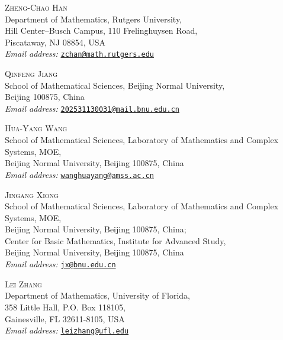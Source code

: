\documentclass[11pt]{article}
\numberwithin{equation}{section}
\theoremstyle{remark}
\begin{document}
\bigskip
\begingroup
\small
\noindent\textsc{Zheng-Chao Han}\\
Department of Mathematics, Rutgers University,\\
Hill Center--Busch Campus, 110 Frelinghuysen Road,\\
Piscataway, NJ 08854, USA\\
\textit{Email address:}
\href{mailto:zchan@math.rutgers.edu}{\nolinkurl{zchan@math.rutgers.edu}}

\medskip
\noindent\textsc{Qinfeng Jiang}\\
School of Mathematical Sciences, Beijing Normal University,\\
Beijing 100875, China\\
\textit{Email address:}
\href{mailto:202531130031@mail.bnu.edu.cn}%
{\nolinkurl{202531130031@mail.bnu.edu.cn}}

\medskip
\noindent\textsc{Hua-Yang Wang}\\
School of Mathematical Sciences, Laboratory of Mathematics and Complex
Systems, MOE,\\
Beijing Normal University, Beijing 100875, China\\
\textit{Email address:}
\href{mailto:wanghuayang@amss.ac.cn}{\nolinkurl{wanghuayang@amss.ac.cn}}

\medskip
\noindent\textsc{Jingang Xiong}\\
School of Mathematical Sciences, Laboratory of Mathematics and Complex
Systems, MOE,\\
Beijing Normal University, Beijing 100875, China;\\
Center for Basic Mathematics, Institute for Advanced Study,\\
Beijing Normal University, Beijing 100875, China\\
\textit{Email address:}
\href{mailto:jx@bnu.edu.cn}{\nolinkurl{jx@bnu.edu.cn}}

\medskip
\noindent\textsc{Lei Zhang}\\
Department of Mathematics, University of Florida,\\
358 Little Hall, P.O. Box 118105,\\
Gainesville, FL 32611-8105, USA\\
\textit{Email address:}
\href{mailto:leizhang@ufl.edu}{\nolinkurl{leizhang@ufl.edu}}
\endgroup
\end{document}
